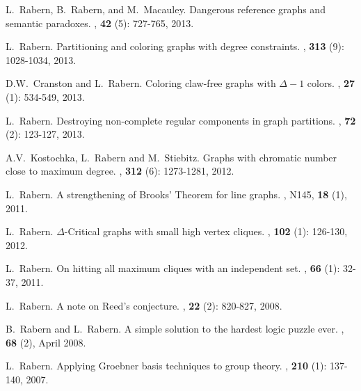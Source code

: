 \documentclass[10pt]{article}
\begin{document}
\begin{enumerate}[{[}1{]}]
\item L.~Rabern, B.~Rabern, and M.~Macauley.
\newblock Dangerous reference graphs and semantic paradoxes.
, \textbf{42} (5): 727-765, 2013.

\item L.~Rabern.
\newblock Partitioning and coloring graphs with degree constraints.
, \textbf{313} (9): 1028-1034, 2013.

\item D.W.~Cranston and L.~Rabern.
\newblock Coloring claw-free graphs with $\Delta - 1$ colors.
, \textbf{27} (1): 534-549, 2013.

\item L.~Rabern.
\newblock Destroying non-complete regular components in graph partitions.
, \textbf{72} (2): 123-127, 2013.

\item A.V.~Kostochka, L.~Rabern and M.~Stiebitz.
\newblock Graphs with chromatic number close to maximum degree.
, \textbf{312} (6): 1273-1281, 2012.

\item L.~Rabern.
\newblock A strengthening of Brooks' Theorem for line graphs.
, N145, \textbf{18} (1), 2011.

\item L.~Rabern.
\newblock $\Delta$-Critical graphs with small high vertex cliques.
, \textbf{102} (1): 126-130, 2012.

\item L.~Rabern. 
\newblock On hitting all maximum cliques with an independent set.
, \textbf{66} (1): 32-37, 2011.

\item L.~Rabern.
\newblock A note on Reed's conjecture.
, \textbf{22} (2): 820-827, 2008.

\item
B.~Rabern and L.~Rabern.
\newblock A simple solution to the hardest logic puzzle ever. 
, \textbf{68} (2), April 2008.

\item L.~Rabern.
\newblock Applying Groebner basis techniques to group theory.
, \textbf{210} (1): 137-140, 2007.


\end{enumerate}
\end{document}
